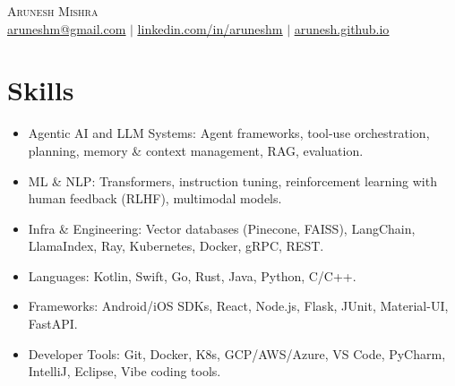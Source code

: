 \documentclass[letterpaper,9pt]{article}
\newcommand{\resumeItem}[1]{
  \item\small{
    {#1 \vspace{-2pt}}
  }
}
\begin{document}

\begin{center}
    {\LARGE \scshape Arunesh \hspace{3mm} Mishra} \\ \vspace{1pt}
    \footnotesize{\href{mailto:aruneshm@gmail.com}{\underline{aruneshm@gmail.com}} $|$ 
    \href{https://linkedin.com/in/...}{\underline{linkedin.com/in/aruneshm}} $|$
    \href{https://arunesh.github.io}{\underline{arunesh.github.io}}}
\end{center}





\section{Skills}
\begin{itemize}[leftmargin=3.5em, itemsep=0pt, label=\tiny$\bullet$]
  \resumeItem {Agentic AI and LLM Systems: Agent frameworks, tool-use orchestration, planning, memory \& context management, RAG, evaluation.}
  \resumeItem {ML \& NLP: Transformers, instruction tuning, reinforcement learning with human feedback (RLHF), multimodal models.}
  \resumeItem {Infra \& Engineering: Vector databases (Pinecone, FAISS), LangChain, LlamaIndex, Ray, Kubernetes, Docker, gRPC, REST.}
  \resumeItem {Languages: Kotlin, Swift, Go, Rust, Java, Python, C/C++.} 
  \resumeItem {Frameworks: Android/iOS SDKs, React, Node.js, Flask, JUnit, Material-UI, FastAPI.}
  \resumeItem {Developer Tools: Git, Docker, K8s, GCP/AWS/Azure, VS Code, PyCharm, IntelliJ, Eclipse, Vibe coding tools.}
\end{itemize}
\end{document}
